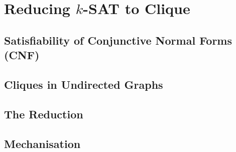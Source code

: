 \chapter{Reducing $k$-SAT to Clique}\label{chap:ksat_clique}

\section{Satisfiability of Conjunctive Normal Forms (CNF)}

\section{Cliques in Undirected Graphs}

\section{The Reduction}

\section{Mechanisation}
